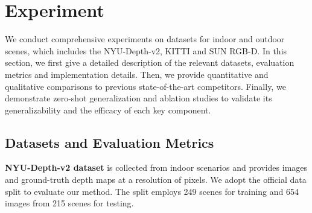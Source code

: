 \documentclass[10pt,twocolumn,letterpaper]{article}
\begin{document}
\begin{table}[htb!]
	\begin{center}
\renewcommand{\arraystretch}{1.3}
	\end{center}
	\caption{\textbf{Quantitative depth comparison on the official split of KITTI dataset}. Note that the Sq Rel is calculated in a different way here. The SILog is the main ranking metric.} \label{table3}
\end{table}

\section{Experiment}
We conduct comprehensive experiments on datasets for indoor and outdoor scenes, which includes the NYU-Depth-v2, KITTI and SUN RGB-D. In this section, we first give a detailed description of the relevant datasets, evaluation metrics and implementation details. Then, we provide quantitative and qualitative comparisons to previous state-of-the-art competitors. Finally, we demonstrate zero-shot generalization and ablation studies to validate its generalizability and the efficacy of each key component.


\subsection{Datasets and Evaluation Metrics}
\textbf{NYU-Depth-v2 dataset} is collected from indoor scenarios and provides images and ground-truth depth maps at a resolution of  pixels. We adopt the official data split to evaluate our method. The split employs 249 scenes for training and 654 images from 215 scenes for testing.
\end{document}
